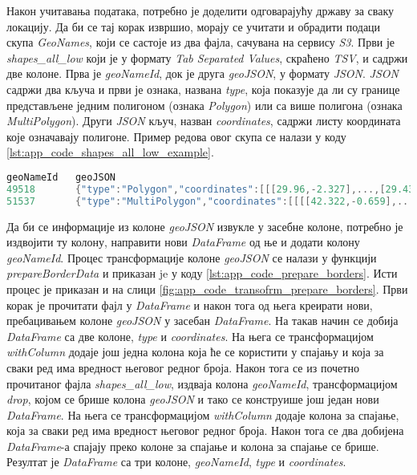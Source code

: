 \documentclass[12pt,oneside]{memoir}
\begin{document}
Након учитавања података, потребно је доделити одговарајућу државу за сваку локацију. Да би се тај корак извршио, морају се учитати и обрадити подаци скупа \textit{GeoNames}, који се састоје из два фајла, сачувана на сервису \textit{S3}. Први је \textit{shapes\_all\_low} који је у формату \textit{Tab Separated Values}, скраћено \textit{TSV}, и садржи две колоне. Прва је \textit{geoNameId}, док је друга \textit{geoJSON}, у формату \textit{JSON}. \textit{JSON} садржи два кључа и први је ознака, названа \textit{type}, која показује да ли су границе представљене једним полигоном (ознака \textit{Polygon}) или са више полигона (ознака \textit{MultiPolygon}). Други \textit{JSON} кључ, назван \textit{coordinates}, садржи листу координата које означавају полигоне. Пример редова овог скупа се налази у коду \ref{lst:app_code_shapes_all_low_example}.

\begin{lstlisting}[caption={Упрошћени пример редова фајла \textit{shapes\_all\_low}}, language=Scala, label={lst:app_code_shapes_all_low_example}]
geoNameId	geoJSON
49518	    {"type":"Polygon","coordinates":[[[29.96,-2.327],...,[29.438,-2.798]]]}
51537	    {"type":"MultiPolygon","coordinates":[[[[42.322,-0.659],...,[43.451,11.491]]]]}
\end{lstlisting}

Да би се информације из колоне \textit{geoJSON} извукле у засебне колоне, потребно је издвојити ту колону, направити нови \textit{DataFrame} од ње и додати колону \textit{geoNameId}. Процес трансформације колоне \textit{geoJSON} се налази у функцији \textit{prepareBorderData} и приказан je у коду \ref{lst:app_code_prepare_borders}. Исти процес је приказан и на слици \ref{fig:app_code_transofrm_prepare_borders}. Први корак је прочитати фајл у \textit{DataFrame} и након тога од њега креирати нови, пребацивањем колоне \textit{geoJSON} у засебан \textit{DataFrame}. На такав начин се добија \textit{DataFrame} са две колоне, \textit{type} и \textit{coordinates}. На њега се трансформацијом \textit{withColumn} додаје још једна колона која ће се користити у спајању и која за сваки ред има вредност његовог редног броја. Након тога се из почетно прочитаног фајла \textit{shapes\_all\_low}, издваја колона \textit{geoNameId}, трансформацијом \textit{drop}, којом се брише колона \textit{geoJSON} и тако се конструише још један нови \textit{DataFrame}. На њега се трансформацијом \textit{withColumn} додаје колона за спајање, која за сваки ред има вредност његовог редног броја. Након тога се два добијена \textit{DataFrame}-а спајају преко колоне за спајање и колона за спајање се брише. Резултат је \textit{DataFrame} са три колоне, \textit{geoNameId}, \textit{type} и \textit{coordinates}.
\end{document}
